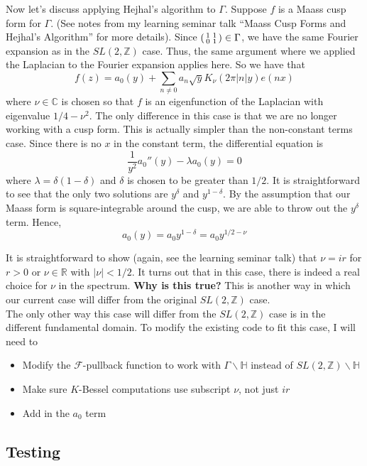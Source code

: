 \documentclass[]{article}
\begin{document}
Now let's discuss applying Hejhal's algorithm to $\Gamma$.
Suppose $f$ is a Maass cusp form for $\Gamma$.
(See notes from my learning seminar talk ``Maass Cusp Forms and Hejhal's Algorithm'' for more details).
Since
$
\begin{psmallmatrix}
1 & 1 \\
0 & 1
\end{psmallmatrix} \in \Gamma
$,
we have the same Fourier expansion as in the $SL(2, \mathbb{Z})$ case.
Thus, the same argument where we applied the Laplacian to the Fourier expansion applies here.
So we have that
$$
f(z) = a_0(y) + \sum_{n\neq0} a_n\sqrt{y}K_{\nu}(2\pi|n|y)e(nx)
$$
where $\nu \in \mathbb{C}$ is chosen so that $f$ is an eigenfunction of the Laplacian with eigenvalue $1/4 - \nu^2$.
The only difference in this case is that we are no longer working with a cusp form.
This is actually simpler than the non-constant terms case.
Since there is no $x$ in the constant term, the differential equation is
$$
\frac{1}{y^2}a_0''(y) - \lambda a_0(y) = 0
$$
where $\lambda = \delta(1 - \delta)$ and $\delta$ is chosen to be greater than $1/2$.
It is straightforward to see that the only two solutions are $y^\delta$ and $y^{1-\delta}$.
By the assumption that our Maass form is square-integrable around the cusp, we are able to throw out the $y^\delta$ term.
Hence,
$$
a_0(y) = a_0y^{1-\delta} = a_0y^{1/2 - \nu}
$$

It is straightforward to show (again, see the learning seminar talk) that $\nu = ir$ for $r > 0$ or $\nu \in \mathbb{R}$ with $|\nu| < 1/2$.
It turns out that in this case, there is indeed a real choice for $\nu$ in the spectrum.
\textbf{Why is this true?}
This is another way in which our current case will differ from the original $SL(2, \mathbb{Z})$ case.
\\

The only other way this case will differ from the $SL(2, \mathbb{Z})$ case is in the different fundamental domain.
To modify the existing code to fit this case, I will need to
\begin{itemize}
	\item Modify the $\mathcal{F}$-pullback function to work with $\Gamma\backslash\mathbb{H}$ instead of $SL(2, \mathbb{Z})\backslash\mathbb{H}$
	\item Make sure $K$-Bessel computations use subscript $\nu$, not just $ir$
	\item Add in the $a_0$ term
\end{itemize}

\subsection{Testing}
\end{document}
